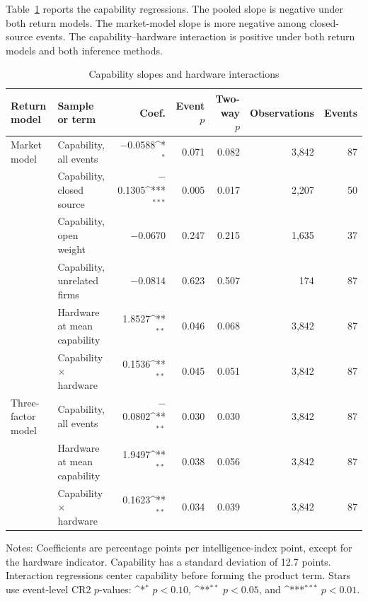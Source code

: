 \documentclass[12pt]{article}
\newcommand{\sym}[1]{\ifmmode^{#1}\else\(^{#1}\)\fi}
\begin{document}
Table~\ref{tab:a5} reports the capability regressions. The pooled slope is
negative under both return models. The market-model slope is more negative
among closed-source events. The capability--hardware interaction is positive
under both return models and both inference methods.

\begin{table}[H]
\centering
\begin{threeparttable}
\caption{Capability slopes and hardware interactions}\label{tab:a5}
\scriptsize
\setlength{\tabcolsep}{3.2pt}
\begin{tabular}{llrrrrr}
\toprule
Return model & Sample or term & Coef. & Event $p$ & Two-way $p$ &
Observations & Events \\
\midrule
Market model
 & Capability, all events        & $-$0.0588\sym{*} & 0.071 & 0.082 & 3,842 & 87 \\
 & Capability, closed source     & $-$0.1305\sym{***} & 0.005 & 0.017 & 2,207 & 50 \\
 & Capability, open weight       & $-$0.0670 & 0.247 & 0.215 & 1,635 & 37 \\
 & Capability, unrelated firms   & $-$0.0814 & 0.623 & 0.507 & 174 & 87 \\
 & Hardware at mean capability   & 1.8527\sym{**} & 0.046 & 0.068 & 3,842 & 87 \\
 & Capability $\times$ hardware  & 0.1536\sym{**} & 0.045 & 0.051 & 3,842 & 87 \\
\addlinespace
Three-factor model
 & Capability, all events        & $-$0.0802\sym{**} & 0.030 & 0.030 & 3,842 & 87 \\
 & Hardware at mean capability   & 1.9497\sym{**} & 0.038 & 0.056 & 3,842 & 87 \\
 & Capability $\times$ hardware  & 0.1623\sym{**} & 0.034 & 0.039 & 3,842 & 87 \\
\bottomrule
\end{tabular}
\begin{tablenotes}\footnotesize
\item Notes: Coefficients are percentage points per intelligence-index
point, except for the hardware indicator. Capability has a standard
deviation of 12.7 points. Interaction regressions center capability before
forming the product term.
Stars use event-level CR2 $p$-values:
\sym{*} $p<0.10$, \sym{**} $p<0.05$, and \sym{***} $p<0.01$.
\end{tablenotes}
\end{threeparttable}
\end{table}
\end{document}
